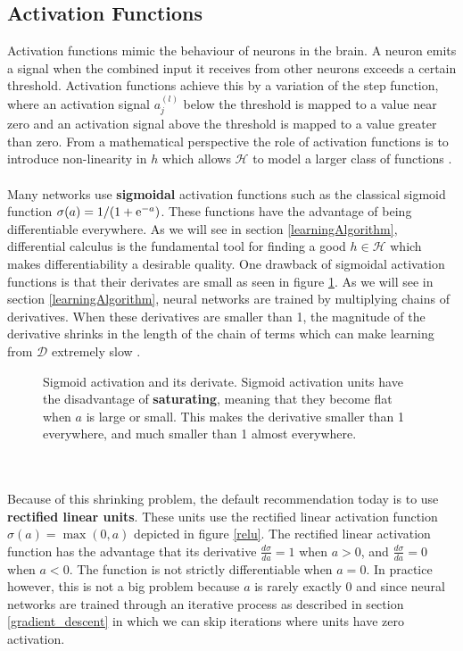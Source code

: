 \subsection{Activation Functions}
\label{activation_functions}
Activation functions mimic the behaviour of neurons in the brain. A neuron emits a signal when the combined input it receives from other neurons exceeds a certain threshold. Activation functions achieve this by a variation of the step function, where an activation signal $a^{(l)}_j$ below the threshold is mapped to a value near zero and an activation signal above the threshold is mapped to a value greater than zero. From a mathematical perspective the role of activation functions is to introduce non-linearity in $h$ which allows $\mathcal{H}$ to model a larger class of functions \citep{goodfellow16}.
\\\\
Many networks use \textbf{sigmoidal} activation functions such as the classical sigmoid function $\sigma(a) = 1/(1 + \mathrm{e}^{-a})$. These functions have the advantage of being differentiable everywhere. As we will see in section \ref{learningAlgorithm}, differential calculus is the fundamental tool for finding a good $h \in \mathcal{H}$ which makes differentiability a desirable quality. One drawback of sigmoidal activation functions is that their derivates are small as seen in figure \ref{sigmoid}. As we will see in section \ref{learningAlgorithm}, neural networks are trained by multiplying chains of derivatives. When these derivatives are smaller than 1, the magnitude of the derivative shrinks in the length of the chain of terms which can make learning from $\mathcal{D}$ extremely slow \citep{goodfellow16}.
\begin{figure}
	\centering
	
	\caption{Sigmoid activation and its derivate. Sigmoid activation units have the disadvantage of \textbf{saturating}, meaning that they become flat when $a$ is large or small. This makes the derivative smaller than 1 everywhere, and much smaller than 1 almost everywhere.}
	\label{sigmoid}
\end{figure}
\\\\
Because of this shrinking problem, the default recommendation today is to use \textbf{rectified linear units}. These units use the rectified linear activation function $\sigma(a) = \max(0, a)$ depicted in figure \ref{relu}. The rectified linear activation function has the advantage that its derivative $\frac{d\sigma}{da} = 1$ when $a > 0$, and $\frac{d\sigma}{da} = 0$ when $a < 0$. The function is not strictly differentiable when $a = 0$. In practice however, this is not a big problem because $a$ is rarely exactly 0 and since neural networks are trained through an iterative process as described in section \ref{gradient_descent} in which we can skip iterations where units have zero activation.
